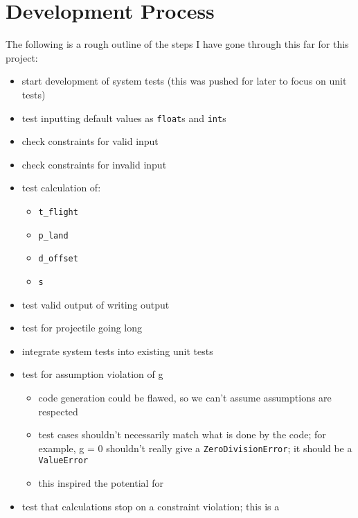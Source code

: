 \chapter{Development Process}
\label{chap:dev-proc}

The following is a rough outline of the steps I have gone through this far for
this project:

\begin{itemize}
      \item start development of system tests (this was pushed for later to
            focus on unit tests)
      \item test inputting default values as \texttt{float}s and \texttt{int}s
      \item check constraints for valid input
      \item check constraints for invalid input
      \item test calculation of:
            \begin{itemize}
                  \item \texttt{t\_flight}
                  \item \texttt{p\_land}
                  \item \texttt{d\_offset}
                  \item \texttt{s}
            \end{itemize}
      \item test valid output of writing output
      \item test for projectile going long
      \item integrate system tests into existing unit tests
      \item test for assumption violation of g
            \begin{itemize}
                  \item code generation could be flawed, so we can't assume
                        assumptions are respected
                  \item test cases shouldn't necessarily match what is done by the
                        code; for example, g = 0 shouldn't really give a
                        \texttt{ZeroDivisionError}; it should be a \texttt{ValueError}
                  \item this inspired the potential for
            \end{itemize}
      \item test that calculations stop on a constraint violation; this is a

\end{itemize}
